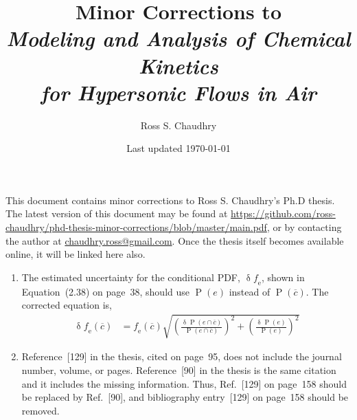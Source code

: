 \documentclass[11 pt]{article}
\title{Minor Corrections to \\
   \emph{Modeling and Analysis of Chemical Kinetics \\
         for Hypersonic Flows in Air} }
\author{Ross S. Chaudhry}
\date{Last updated \today}
\newcommand{\ol}{\overline}
\newcommand\myP{\operatorname{P}}
\newcommand\myerror{\operatorname{\delta}}
\newcommand\fe{\operatorname{\mathit{f}_e}}
\begin{document}
\maketitle

\noindent
This document contains minor corrections to Ross S. Chaudhry's Ph.D thesis.
The latest version of this document may be found at \url{https://github.com/ross-chaudhry/phd-thesis-minor-corrections/blob/master/main.pdf},
   or by contacting the author at \href{mailto:chaudhry.ross@gmail.com}{chaudhry.ross@gmail.com}.
Once the thesis itself becomes available online, it will be linked here also.


\begin{enumerate}

\item
The estimated uncertainty for the conditional PDF, $\myerror\fe$,
   shown in Equation~(2.38) on page~38, should use $\myP\left(e\right)$
   instead of $\myP\left(\ol{c}\right)$.
The corrected equation is,
%
\begin{align*}
   \myerror \fe\left(\ol{c}\right) &= \fe\left(\ol{c}\right) \sqrt{ \left(\frac{\myerror \myP\left(e \cap \ol{c}\right)}{\myP\left(e \cap \ol{c}\right)}\right)^2
                                                                  + \left(\frac{\myerror \myP\left(           e \right)}{\myP\left(           e \right)}\right)^2 }
\end{align*}

\item
Reference~[129] in the thesis, cited on page~95,
   does not include the journal number, volume, or pages.
Reference~[90] in the thesis is the same citation and it includes the missing information.
Thus, Ref.~[129] on page~158 should be replaced by Ref.~[90],
   and bibliography entry~[129] on page~158 should be removed.

% 

\end{enumerate}
\end{document}
